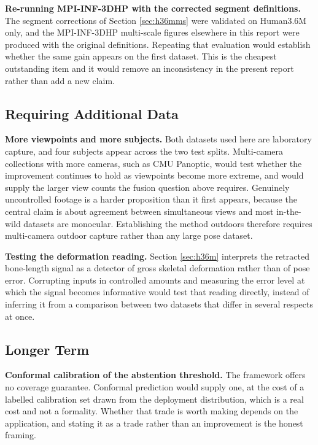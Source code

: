 \documentclass[12pt,a4paper]{report}
\begin{document}
\noindent \textbf{Re-running MPI-INF-3DHP with the corrected segment definitions.} The segment corrections of Section \ref{sec:h36mms} were validated on Human3.6M only, and the MPI-INF-3DHP multi-scale figures elsewhere in this report were produced with the original definitions. Repeating that evaluation would establish whether the same gain appears on the first dataset. This is the cheapest outstanding item and it would remove an inconsistency in the present report rather than add a new claim.

\subsection*{Requiring Additional Data}

\noindent \textbf{More viewpoints and more subjects.} Both datasets used here are laboratory capture, and four subjects appear across the two test splits. Multi-camera collections with more cameras, such as CMU Panoptic, would test whether the improvement continues to hold as viewpoints become more extreme, and would supply the larger view counts the fusion question above requires. Genuinely uncontrolled footage is a harder proposition than it first appears, because the central claim is about agreement between simultaneous views and most in-the-wild datasets are monocular. Establishing the method outdoors therefore requires multi-camera outdoor capture rather than any large pose dataset.

\noindent \textbf{Testing the deformation reading.} Section \ref{sec:h36m} interprets the retracted bone-length signal as a detector of gross skeletal deformation rather than of pose error. Corrupting inputs in controlled amounts and measuring the error level at which the signal becomes informative would test that reading directly, instead of inferring it from a comparison between two datasets that differ in several respects at once.

\subsection*{Longer Term}

\noindent \textbf{Conformal calibration of the abstention threshold.} The framework offers no coverage guarantee. Conformal prediction would supply one, at the cost of a labelled calibration set drawn from the deployment distribution, which is a real cost and not a formality. Whether that trade is worth making depends on the application, and stating it as a trade rather than an improvement is the honest framing.
\end{document}

